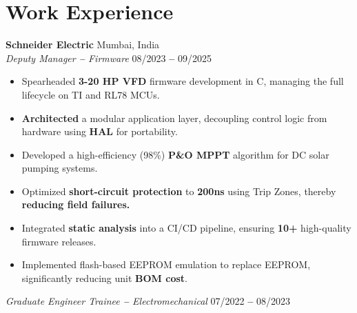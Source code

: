 \documentclass[letterpaper,11pt]{article}
\begin{document}
\section{Work Experience}
\textbf{Schneider Electric} \hfill Mumbai, India \\
\textit{Deputy Manager \textbf{--} Firmware} \hfill 08/2023  \textbf{--}  09/2025 \\
\begin{itemize}[leftmargin=*]
    \item Spearheaded \textbf{3-20 HP VFD} firmware development in C, managing the full lifecycle on TI and RL78 MCUs.
    \item \textbf{Architected} a modular application layer, decoupling control logic from hardware using \textbf{HAL} for portability. 
    \item Developed a high-efficiency (98\%) \textbf{P\&O MPPT} algorithm for DC solar pumping systems.   
    \item Optimized \textbf{short-circuit protection} to \textbf{200ns} using Trip Zones, thereby \textbf{reducing field failures.}    
    \item Integrated \textbf{static analysis} into a CI/CD pipeline, ensuring \textbf{10+} high-quality firmware releases. 
    \item Implemented flash-based EEPROM emulation to replace EEPROM, significantly reducing unit \textbf{BOM cost}.
  \end{itemize}
\vspace{8pt}
\noindent
\textit{Graduate Engineer Trainee \textbf{--} Electromechanical} \hfill 07/2022 \textbf{--} 08/2023 \\
\end{document}

